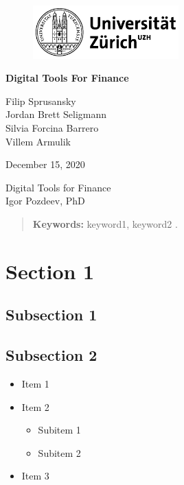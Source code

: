 \documentclass[a4paper,12pt]{article}
\begin{document}
	
	\begin{titlepage}
		\centering
		\begin{figure}[!h]
			\centering
			\includegraphics[width=0.5\textwidth]{UZH}
		\end{figure}
		\Large{\textbf{Digital Tools For Finance}\\}

		
		\vfill 
		
		\large{Filip Sprusansky \\ 
				Jordan Brett Seligmann \\
				Silvia Forcina Barrero\\
				Villem Armulik}
		
		\vfill
			
		\large{December 15, 2020}
		
		\vfill
		\vfill
	
		\large{Digital Tools for Finance \\ Igor Pozdeev, PhD \\ }
	
		\vfill
		\begin{abstract}
		\noindent
			\blindtext
			
			\vspace{3mm}
			
			\noindent \textbf{Keywords:} keyword1, keyword2 .
		\end{abstract}
		
		
	\end{titlepage}
	
	
	\clearpage
	\tableofcontents
	
	\clearpage
	\listoffigures
	
	\clearpage
	\listoftables
	\clearpage	
	
	\section{Section 1}
	\subsection{Subsection 1}
    \blindtext
    \subsection{Subsection 2}
    \blindtext
    \begin{itemize}
    	\item Item 1
    	\item Item 2
    	\begin{itemize}
    		\item Subitem 1
    		\item Subitem 2
    	\end{itemize}
    	\item Item 3
    \end{itemize}
\end{document}
